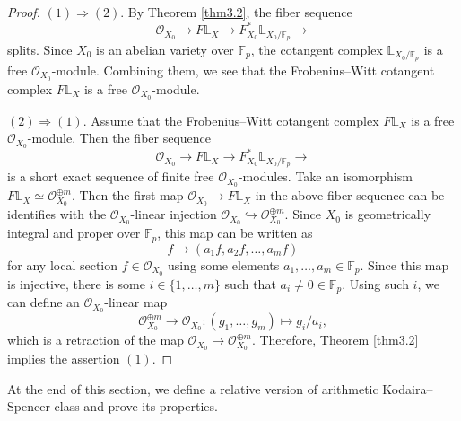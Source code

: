 \documentclass[11pt, a4paper]{amsart}
\theoremstyle{plain}
\theoremstyle{definition}
\begin{document}
\begin{proof}
   $(1)\Rightarrow (2)$. By Theorem \ref{thm3.2}, the fiber sequence\[\mathcal O_{X_0}\to F\mathbb L_X\to F_{X_0}^*\mathbb L_{X_0/\mathbb F_p}\to \] splits. Since $X_0$ is an abelian variety over $\mathbb F_p$, the cotangent complex $\mathbb L_{X_0/\mathbb F_p}$ is a free $\mathcal O_{X_0}$-module. Combining them, we see that the Frobenius--Witt cotangent complex $F\mathbb L_X$ is a free $\mathcal O_{X_0}$-module.

   $(2)\Rightarrow (1)$. Assume that the Frobenius--Witt cotangent complex $F\mathbb L_X$ is a free $\mathcal O_{X_0}$-module. Then the fiber sequence\[\mathcal O_{X_0}\to F\mathbb L_X\to F_{X_0}^*\mathbb L_{X_0/\mathbb F_p}\to\] is a short exact sequence of finite free $\mathcal O_{X_0}$-modules. Take an isomorphism $F\mathbb L_X\simeq \mathcal O_{X_0}^{\oplus m}$. Then the first map $\mathcal O_{X_0}\to F\mathbb L_X$ in the above fiber sequence can be identifies with the $\mathcal O_{X_0}$-linear injection $\mathcal O_{X_0}\hookrightarrow \mathcal O_{X_0}^{\oplus m}$. Since $X_0$ is geometrically integral and proper over $\mathbb F_p$, this map can be written as \[f\mapsto (a_1f,a_2f,\dots,a_mf)\] for any local section $f\in \mathcal O_{X_0}$ using some elements $a_1,\dots,a_m\in \mathbb F_p$. Since this map is injective, there is some $i\in \{1,\dots,m\}$ such that $a_i\neq0\in \mathbb F_p$. Using such $i$, we can define an $\mathcal O_{X_0}$-linear map\[\mathcal O_{X_0}^{\oplus m}\to \mathcal O_{X_0}:(g_1,\dots,g_m)\mapsto g_i/a_i,\] which is a retraction of the map $\mathcal O_{X_0}\to \mathcal O_{X_0}^{\oplus m}$. Therefore, Theorem \ref{thm3.2} implies the assertion $(1)$.
\end{proof}

At the end of this section, we define a relative version of arithmetic Kodaira--Spencer class and prove its properties.
\end{document}
